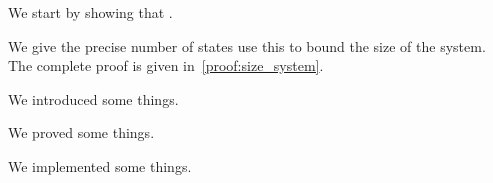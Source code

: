 We start by showing that .
\begin{lemma}
    \label{lemma:size_system}
\end{lemma}
\begin{proofsketch}
    We give the precise number of states use this to bound the size of the system.
    The complete proof is given in~\vref{proof:size_system}.
\end{proofsketch}




\newpage
\begin{summary}
    \item We introduced some things.
    \item We proved some things.
    \item We implemented some things.
\end{summary}

